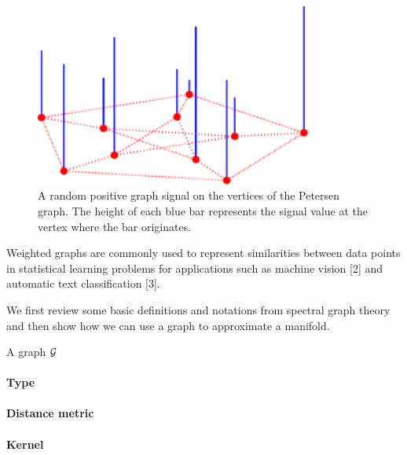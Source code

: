 \begin{figure}[ht]
	\centering
	\includegraphics[height=6cm]{img/example_graph}
	\caption[]{A random positive graph signal on the vertices of the Petersen graph. The height of each blue bar represents the signal value at the vertex where the bar originates.\footnotemark}
	\label{example_graph}
\end{figure}

Weighted graphs are commonly used to represent similarities between data points in statistical learning problems for applications such as machine vision
[2] and automatic text classification [3].

We first review some basic definitions and notations from spectral graph theory and then show how we can use a graph to approximate a manifold.



A graph $\mathcal{G}$

\paragraph{Type}

\paragraph{Distance metric}

\paragraph{Kernel}

